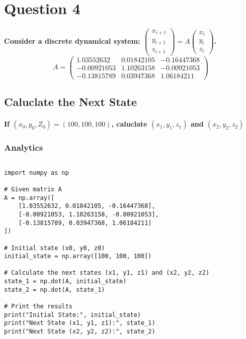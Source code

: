 \section{Question 4}
\paragraph{Consider a discrete dynamical system:
    $
        \begin{pmatrix}
            x_{i+1} \\
            y_{i+1} \\
            z_{i+1}
        \end{pmatrix} = A
        \begin{pmatrix}
            x_{i} \\
            y_{i} \\
            z_{i}
        \end{pmatrix}
    $.
    $$
        A=\begin{pmatrix}
            1.03552632  & 0.01842105 & -0.16447368 \\
            -0.00921053 & 1.10263158 & -0.00921053 \\
            -0.13815789 & 0.03947368 & 1.06184211
        \end{pmatrix}
    $$
}
\subsection{Caluclate the Next State}
\paragraph{If $(x_0,y_0,Z_0)=(100,100,100)$, caluclate $(x_1,y_1,z_1)$ and $(x_2,y_2,z_2)$}
\subsubsection{Analytics}
% 
$$$$
\begin{lstlisting}[style=pystyle]
import numpy as np

# Given matrix A
A = np.array([
    [1.03552632, 0.01842105, -0.16447368],
    [-0.00921053, 1.10263158, -0.00921053],
    [-0.13815789, 0.03947368, 1.06184211]
])

# Initial state (x0, y0, z0)
initial_state = np.array([100, 100, 100])

# Calculate the next states (x1, y1, z1) and (x2, y2, z2)
state_1 = np.dot(A, initial_state)
state_2 = np.dot(A, state_1)

# Print the results
print("Initial State:", initial_state)
print("Next State (x1, y1, z1):", state_1)
print("Next State (x2, y2, z2):", state_2)
\end{lstlisting}
% 
% 
% 
